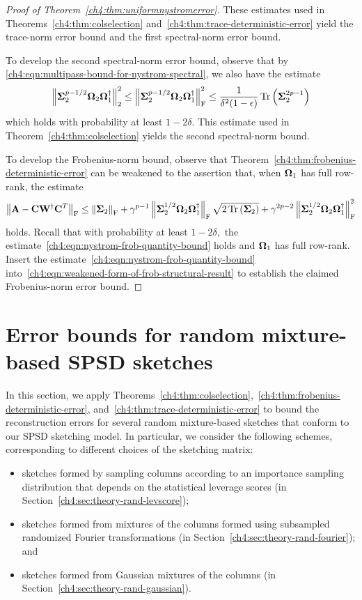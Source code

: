 \begin{proof}[Proof of Theorem~\ref{ch4:thm:uniformnystromerror}]
These estimates used in Theorems~\ref{ch4:thm:colselection}
and~\ref{ch4:thm:trace-deterministic-error} yield the trace-norm error bound
and the first spectral-norm error bound.

To develop the second spectral-norm error bound, observe that by \eqref{ch4:eqn:multipass-bound-for-nystrom-spectral},
we also have the estimate 
\[
 \left\|\mathbf{\Sigma}_2^{p-1/2} \mathbf{\Omega}_2 \mathbf{\Omega}_1^\dagger\right\|_2^2 \leq 
 \left\|\mathbf{\Sigma}_2^{p-1/2} \mathbf{\Omega}_2 \mathbf{\Omega}_1^\dagger\right\|_\mathrm{F}^2 \leq
 \frac{1}{\delta^2 (1-\epsilon)} \operatorname{Tr}\left(\mathbf{\Sigma}_2^{2p-1}\right)
\]
which holds with probability at least $1 - 2\delta.$ This estimate used in Theorem~\ref{ch4:thm:colselection}
yields the second spectral-norm bound.

To develop the Frobenius-norm bound, observe that Theorem~\ref{ch4:thm:frobenius-deterministic-error}
can be weakened to the assertion that, when $\mathbf{\Omega}_1$ has full row-rank, the estimate
\begin{equation}
 \left\|\mathbf{A} - \mathbf{C} \mathbf{W}^\dagger \mathbf{C}^T\right\|_\mathrm{F} \leq \left\|\mathbf{\Sigma}_2\right\|_\mathrm{F} 
  + \gamma^{p-1} \left\|\mathbf{\Sigma}_2^{1/2} \mathbf{\Omega}_2 \mathbf{\Omega}_1^\dagger\right\|_\mathrm{F} \sqrt{2 \operatorname{Tr}\left(\mathbf{\Sigma}_2\right)} 
  + \gamma^{2p-2} \left\|\mathbf{\Sigma}_2^{1/2} \mathbf{\Omega}_2 \mathbf{\Omega}_1^\dagger\right\|_\mathrm{F}^2
  \label{ch4:eqn:weakened-form-of-frob-structural-result}
\end{equation}
holds. Recall that with probability at least $1 - 2\delta,$
the estimate~\eqref{ch4:eqn:nystrom-frob-quantity-bound} holds and $\mathbf{\Omega}_1$ has full row-rank. 
Insert the estimate~\eqref{ch4:eqn:nystrom-frob-quantity-bound} into~\eqref{ch4:eqn:weakened-form-of-frob-structural-result}
to establish the claimed Frobenius-norm error bound.

\end{proof}

\section{Error bounds for random mixture-based SPSD sketches}
\label{ch4:sec:mixturesketches}

In this section, we apply 
Theorems~\ref{ch4:thm:colselection},~\ref{ch4:thm:frobenius-deterministic-error}, 
and~\ref{ch4:thm:trace-deterministic-error} 
to bound the reconstruction errors for several random mixture-based 
sketches that conform to our SPSD sketching model.
In particular, we consider the following schemes, corresponding to different choices of the sketching matrix:
\begin{itemize}
\item sketches formed by sampling columns according to an importance sampling distribution that 
depends on the statistical leverage scores
(in Section~\ref{ch4:sec:theory-rand-levscore});
\item sketches formed from mixtures of the columns formed using subsampled randomized Fourier transformations
(in Section~\ref{ch4:sec:theory-rand-fourier}); and
\item sketches formed from Gaussian mixtures of the 
columns 
(in Section~\ref{ch4:sec:theory-rand-gaussian}).
\end{itemize}

